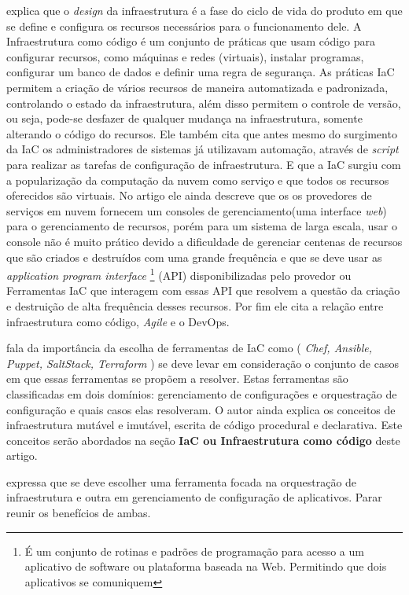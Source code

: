 \cite{Carnegie} explica que o \textit{design} da infraestrutura é a fase do ciclo de vida do produto em que se define e configura os recursos necessários para o funcionamento dele. A Infraestrutura como código é um conjunto de práticas que usam código para configurar recursos, como máquinas e redes (virtuais), instalar programas, configurar um banco de dados e definir uma regra de segurança. As práticas IaC permitem a criação de vários recursos de maneira automatizada e padronizada, controlando o estado da infraestrutura, além disso permitem o controle de versão, ou seja, pode-se desfazer de qualquer mudança na infraestrutura, somente alterando o código do recursos. Ele também cita que antes mesmo do surgimento da IaC os administradores de sistemas já utilizavam automação, através de \textit{script} para realizar as tarefas de configuração de infraestrutura. E que a IaC surgiu com a popularização da computação da nuvem como serviço e que todos os recursos oferecidos são virtuais. No artigo ele ainda descreve que os os provedores de serviços em nuvem fornecem um consoles de gerenciamento(uma interface \textit{web}) para o gerenciamento de recursos, porém para um sistema de larga escala, usar o console não é muito prático devido a dificuldade de gerenciar centenas de recursos que são criados e destruídos com uma grande frequência e que se deve usar as \textit{application program interface} \footnote{É um conjunto de rotinas e padrões de programação para acesso a um aplicativo de software ou plataforma baseada na Web. Permitindo que dois aplicativos se comuniquem } (API) disponibilizadas pelo provedor ou Ferramentas IaC  que interagem com essas API que resolvem a questão da criação e destruição de alta frequência desses recursos. Por fim ele cita a relação entre infraestrutura como código, \textit{Agile} e o DevOps. 

\hfill

  fala da importância da escolha de ferramentas de IaC como (\textit{ Chef, Ansible, Puppet, SaltStack, Terraform }) se deve levar em consideração o conjunto de casos em que essas ferramentas se propõem a resolver. Estas ferramentas são classificadas em dois domínios: gerenciamento de configurações e orquestração de configuração e quais casos elas resolveram. O autor ainda explica os conceitos de infraestrutura mutável e imutável, escrita de código procedural e declarativa. Este conceitos serão abordados na seção  \textbf{IaC ou Infraestrutura como código} deste artigo.

 expressa que se deve escolher uma ferramenta focada na orquestração de infraestrutura e outra em gerenciamento de configuração de aplicativos. Parar reunir os benefícios de ambas. 

